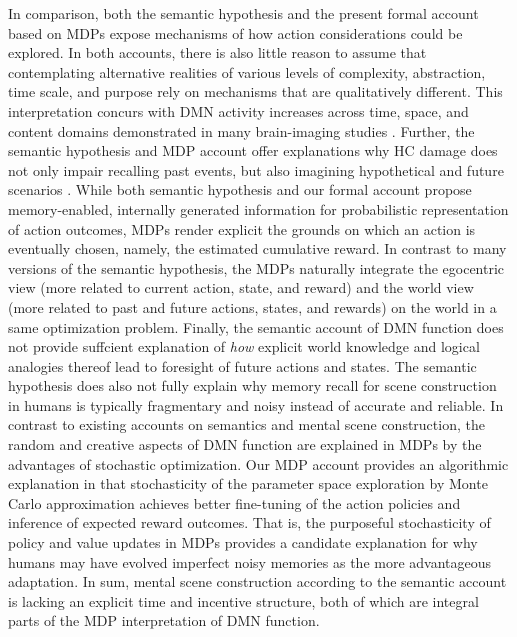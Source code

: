 \documentclass[10pt,letterpaper]{article}
\begin{document}
In comparison,
both the semantic hypothesis and the present formal account based on MDPs
expose mechanisms of how action considerations could be explored.
In both accounts,
there is also little reason to assume that contemplating alternative realities of various
levels of complexity, abstraction, time scale, and purpose
rely on mechanisms that are qualitatively different. This interpretation concurs with
DMN activity increases across time, space, and content domains
demonstrated in many brain-imaging studies
\citep{spreng2009common, laird2009, bzdok2012morality, binder2009}.
Further, the semantic hypothesis
and MDP account offer explanations why HC damage does
not only impair recalling past events, but also imagining hypothetical and future
scenarios \citep{hassabis2007patients}.
While both semantic hypothesis and
our formal account propose memory-enabled, internally
generated information for probabilistic representation of action outcomes,
MDPs render explicit the grounds on which an action is
eventually chosen, namely, the estimated cumulative reward.
In contrast to many versions of the semantic hypothesis,
the MDPs naturally integrate the egocentric view
(more related to current action, state, and reward) and the
world view (more related to past and future actions, states, and rewards)
on the world in a same optimization problem.
Finally,
the semantic account of DMN function does not provide
suffcient explanation of \textit{how}
explicit world knowledge and logical analogies thereof
lead to foresight of future actions and states.
The semantic hypothesis does also not fully explain why memory recall
for scene construction in humans is typically fragmentary and noisy
instead of accurate and reliable.
In contrast to existing accounts on semantics and
mental scene construction, the random and creative aspects of DMN function
are explained in MDPs by the advantages of stochastic optimization.
Our MDP account provides an algorithmic explanation in that
stochasticity of the parameter space exploration
by Monte Carlo approximation achieves better fine-tuning of the
action policies and inference of expected reward outcomes.
That is, the purposeful stochasticity of policy and value updates
in MDPs provides a candidate explanation for why humans may
have evolved imperfect noisy memories
as the more advantageous adaptation.
In sum, mental scene construction according to the semantic
account is lacking an explicit time and incentive structure,
both of which are integral parts of the MDP interpretation of DMN function.
\end{document}
